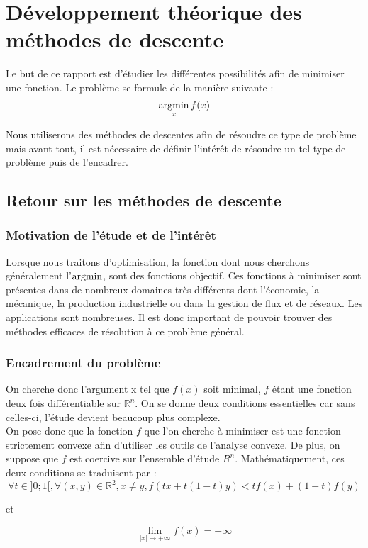 \chapter{Développement théorique des méthodes de descente}

Le but de ce rapport est d'étudier les différentes possibilités afin de minimiser une fonction. Le problème se formule de la manière suivante : 
\begin{equation}
\argmin_x f(x)
\end{equation}

Nous utiliserons des méthodes de descentes afin de résoudre ce type de problème mais avant tout, il est nécessaire de définir l'intérêt de résoudre un tel type de problème puis de l'encadrer.

\section{Retour sur les méthodes de descente}
\subsection{Motivation de l'étude et de l'intérêt}
Lorsque nous traitons d'optimisation, la fonction dont nous cherchons généralement l'$\argmin$, sont des fonctions objectif. Ces fonctions à minimiser sont présentes dans de nombreux domaines très différents dont l'économie, la mécanique, la production industrielle ou dans la gestion de flux et de réseaux. Les applications sont nombreuses. Il est donc important de pouvoir trouver des méthodes efficaces de résolution à ce problème général. 
\subsection{Encadrement du problème}
On cherche donc l'argument x tel que $f(x)$ soit minimal, $f$ étant une fonction deux fois différentiable sur $\mathbb{R}^n$. On se donne deux conditions essentielles car sans celles-ci, l'étude devient beaucoup plus complexe. \\

On pose donc que la fonction $f$ que l'on cherche à minimiser est une fonction strictement convexe afin d'utiliser les outils de l'analyse convexe. De plus, on suppose que $f$ est coercive sur l'ensemble d'étude $R^n$. Mathématiquement, ces deux conditions se traduisent par :
$$
\forall t \in ]0;1[, \forall (x,y) \in \mathbb{R}^2, x\neq y, f(tx+t(1-t)y)<tf(x)+(1-t)f(y) 
$$
\begin{center}
	et
\end{center}
$$
\lim\limits_{|x|\rightarrow +\infty}f(x)=+\infty
$$

